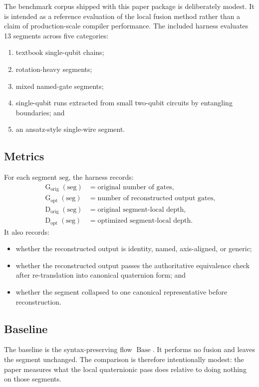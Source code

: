 \documentclass[11pt]{article}
\theoremstyle{remark}
\newcommand{\Baseline}{\operatorname{Base}}
\newcommand{\GateCount}{\operatorname{G}}
\newcommand{\Depth}{\operatorname{D}}
\begin{document}
The benchmark corpus shipped with this paper package is deliberately modest. It
is intended as a reference evaluation of the local fusion method rather than a
claim of production-scale compiler performance. The included harness evaluates
13 segments across five categories:
\begin{enumerate}[label=(\arabic*), leftmargin=1.5em]
\item textbook single-qubit chains;
\item rotation-heavy segments;
\item mixed named-gate segments;
\item single-qubit runs extracted from small two-qubit circuits by entangling
boundaries; and
\item an ansatz-style single-wire segment.
\end{enumerate}

\subsection{Metrics}

For each segment $\mathrm{seg}$, the harness records:
\begin{align*}
\GateCount_{\mathrm{orig}}(\mathrm{seg}) &= \text{original number of gates},\\
\GateCount_{\mathrm{opt}}(\mathrm{seg}) &= \text{number of reconstructed output gates},\\
\Depth_{\mathrm{orig}}(\mathrm{seg}) &= \text{original segment-local depth},\\
\Depth_{\mathrm{opt}}(\mathrm{seg}) &= \text{optimized segment-local depth}.
\end{align*}
It also records:
\begin{itemize}[leftmargin=1.5em]
\item whether the reconstructed output is identity, named, axis-aligned, or
generic;
\item whether the reconstructed output passes the authoritative equivalence check
after re-translation into canonical quaternion form; and
\item whether the segment collapsed to one canonical representative before
reconstruction.
\end{itemize}

\subsection{Baseline}

The baseline is the syntax-preserving flow $\Baseline$. It performs no fusion and
leaves the segment unchanged. The comparison is therefore intentionally modest:
the paper measures what the local quaternionic pass does relative to doing
nothing on those segments.
\end{document}
